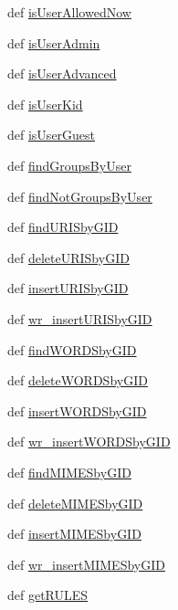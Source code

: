 \begin{DoxyCompactItemize}
\item 
def \hyperlink{classdb__layer_1_1_database_af6ba4fcf6bcd589b0c85b05f49f46ef5}{is\-User\-Allowed\-Now}
\item 
def \hyperlink{classdb__layer_1_1_database_a9ddac6b8ec475ecd6e817329416e3d22}{is\-User\-Admin}
\item 
def \hyperlink{classdb__layer_1_1_database_abbe6297269170e88f0ebe7da784fb62b}{is\-User\-Advanced}
\item 
def \hyperlink{classdb__layer_1_1_database_a3aaf3d095b7c6d005ec9061f83ccdc66}{is\-User\-Kid}
\item 
def \hyperlink{classdb__layer_1_1_database_a9ff75e8e93503e1e6b5ceb083910864a}{is\-User\-Guest}
\item 
def \hyperlink{classdb__layer_1_1_database_acf2271857a561c1e17069068f5c7e317}{find\-Groups\-By\-User}
\item 
def \hyperlink{classdb__layer_1_1_database_a782bfdf0a4415ef9f520722125851924}{find\-Not\-Groups\-By\-User}
\item 
def \hyperlink{classdb__layer_1_1_database_abe7e2fc7937e3fd641a8ec5275b4db60}{find\-U\-R\-I\-Sby\-G\-I\-D}
\item 
def \hyperlink{classdb__layer_1_1_database_a9182f4e89992da5de14ae67f466514df}{delete\-U\-R\-I\-Sby\-G\-I\-D}
\item 
def \hyperlink{classdb__layer_1_1_database_aebc7fd132c862539ede9959fa4257d2a}{insert\-U\-R\-I\-Sby\-G\-I\-D}
\item 
def \hyperlink{classdb__layer_1_1_database_a3ede692ddfa18fd73ce142341f21e6a0}{wr\-\_\-insert\-U\-R\-I\-Sby\-G\-I\-D}
\item 
def \hyperlink{classdb__layer_1_1_database_a7f168024109c6490cca9f764cd0bbeac}{find\-W\-O\-R\-D\-Sby\-G\-I\-D}
\item 
def \hyperlink{classdb__layer_1_1_database_af7c91fdd73898b9e2aa1d1e04ebcb8a6}{delete\-W\-O\-R\-D\-Sby\-G\-I\-D}
\item 
def \hyperlink{classdb__layer_1_1_database_a849faf2993ee0d75f38639f22c3553e7}{insert\-W\-O\-R\-D\-Sby\-G\-I\-D}
\item 
def \hyperlink{classdb__layer_1_1_database_abf6ce37aea5202f161dbd3e3c41d6a6e}{wr\-\_\-insert\-W\-O\-R\-D\-Sby\-G\-I\-D}
\item 
def \hyperlink{classdb__layer_1_1_database_a940f5d9df2aa98c4c4452d9a005a0788}{find\-M\-I\-M\-E\-Sby\-G\-I\-D}
\item 
def \hyperlink{classdb__layer_1_1_database_a844ac1872f0ddf55d238e2bc229354c0}{delete\-M\-I\-M\-E\-Sby\-G\-I\-D}
\item 
def \hyperlink{classdb__layer_1_1_database_ae95955bc5ae21324a753dca4d76f69f1}{insert\-M\-I\-M\-E\-Sby\-G\-I\-D}
\item 
def \hyperlink{classdb__layer_1_1_database_ac2a8936466701acf8972dd1dbb73d0ad}{wr\-\_\-insert\-M\-I\-M\-E\-Sby\-G\-I\-D}
\item 
def \hyperlink{classdb__layer_1_1_database_a014383f7f432ef974c12c87bdbe08546}{get\-R\-U\-L\-E\-S}
\end{DoxyCompactItemize}
